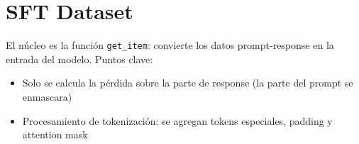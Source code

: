 \section{SFT Dataset}
El núcleo es la función \texttt{get\_item}: convierte los datos prompt-response en la entrada del modelo. Puntos clave:
\begin{itemize}
  \item Solo se calcula la pérdida sobre la parte de response (la parte del prompt se enmascara)
  \item Procesamiento de tokenización: se agregan tokens especiales, padding y attention mask
\end{itemize}

